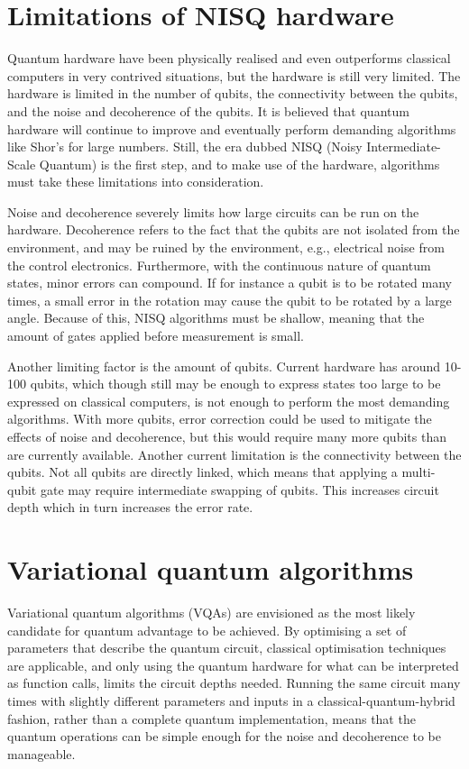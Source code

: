 \section{Limitations of NISQ hardware}
Quantum hardware have been physically realised and even outperforms classical computers in very contrived situations, but the hardware is still very limited.
The hardware is limited in the number of qubits, the connectivity between the qubits, and the noise and decoherence of the qubits.
It is believed that quantum hardware will continue to improve and eventually perform demanding algorithms like Shor's for large numbers.
Still, the era dubbed NISQ (Noisy Intermediate-Scale Quantum) is the first step, and to make use of the hardware, algorithms must take these limitations into consideration.

Noise and decoherence severely limits how large circuits can be run on the hardware.
Decoherence refers to the fact that the qubits are not isolated from the environment, and may be ruined by the environment, e.g., electrical noise from the control electronics.
Furthermore, with the continuous nature of quantum states, minor errors can compound.
If for instance a qubit is to be rotated many times, a small error in the rotation may cause the qubit to be rotated by a large angle.
Because of this, NISQ algorithms must be shallow, meaning that the amount of gates applied before measurement is small.

Another limiting factor is the amount of qubits.
Current hardware has around 10-100 qubits, which though still may be enough to express states too large to be expressed on classical computers, is not enough to perform the most demanding algorithms.
With more qubits, error correction could be used to mitigate the effects of noise and decoherence, but this would require many more qubits than are currently available.
Another current limitation is the connectivity between the qubits.
Not all qubits are directly linked, which means that applying a multi-qubit gate may require intermediate swapping of qubits.
This increases circuit depth which in turn increases the error rate.

\section{Variational quantum algorithms}
\label{sec:vqa}
Variational quantum algorithms (VQAs) are envisioned as the most likely candidate for quantum advantage to be achieved.
By optimising a set of parameters that describe the quantum circuit, classical optimisation techniques are applicable, and only using the quantum hardware for what can be interpreted as function calls, limits the circuit depths needed.
Running the same circuit many times with slightly different parameters and inputs in a classical-quantum-hybrid fashion, rather than a complete quantum implementation, means that the quantum operations can be simple enough for the noise and decoherence to be manageable.

